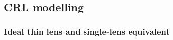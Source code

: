 \begin{refsection}
\subsection{CRL modelling}\label{sec:CRL_modelling}

\subsubsection*{Ideal thin lens and single-lens equivalent}


\end{refsection}
